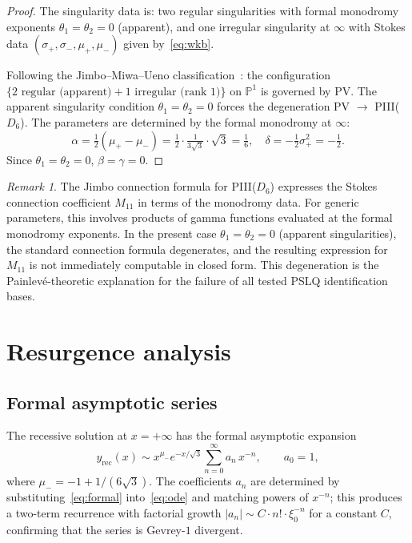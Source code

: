 \documentclass[11pt,a4paper]{article}
\theoremstyle{definition}
\theoremstyle{remark}
\newtheorem{remark}[theorem]{Remark}
\begin{document}
\begin{proof}
The singularity data is: two regular
singularities with formal monodromy
exponents $\theta_1 = \theta_2 = 0$
(apparent), and one irregular singularity
at $\infty$ with Stokes data
$(\sigma_+, \sigma_-, \mu_+, \mu_-)$
given by~\eqref{eq:wkb}.

Following the Jimbo--Miwa--Ueno
classification~\cite{jimbo1981}:
the configuration
$\{2 \text{ regular (apparent)} +
1 \text{ irregular (rank 1)}\}$ on
$\mathbb{P}^1$ is governed by PV.
The apparent singularity condition
$\theta_1 = \theta_2 = 0$ forces the
degeneration PV $\to$ PIII($D_6$).
The parameters are determined by the
formal monodromy at $\infty$:
\[
  \alpha = \tfrac{1}{2}(\mu_+ - \mu_-)
  = \tfrac{1}{2} \cdot \tfrac{1}{3\sqrt{3}}
  \cdot \sqrt{3}
  = \tfrac{1}{6},
  \quad \delta = -\tfrac{1}{2}\sigma_+^2
  = -\tfrac{1}{2}.
\]
Since $\theta_1 = \theta_2 = 0$,
$\beta = \gamma = 0$.
\end{proof}

\begin{remark}
The Jimbo connection formula for PIII($D_6$)
expresses the Stokes connection coefficient
$M_{11}$ in terms of the monodromy data.
For generic parameters, this involves
products of gamma functions evaluated at
the formal monodromy exponents. In the
present case $\theta_1 = \theta_2 = 0$
(apparent singularities), the standard
connection formula degenerates, and the
resulting expression for $M_{11}$ is not
immediately computable in closed form.
This degeneration is the Painlev\'e-theoretic
explanation for the failure of all tested
PSLQ identification bases.
\end{remark}


\section{Resurgence analysis}
\label{sec:resurgence}

\subsection{Formal asymptotic series}

The recessive solution at $x=+\infty$ has the
formal asymptotic expansion
\begin{equation}\label{eq:formal}
  y_{\mathrm{rec}}(x) \sim
  x^{\mu_-} e^{-x/\sqrt{3}}
  \sum_{n=0}^{\infty} a_n\,x^{-n},
  \qquad a_0 = 1,
\end{equation}
where $\mu_- = -1 + 1/(6\sqrt{3})$.
The coefficients $a_n$ are determined by
substituting~\eqref{eq:formal}
into~\eqref{eq:ode} and matching powers of
$x^{-n}$; this produces a two-term recurrence
with factorial growth $|a_n| \sim C \cdot n!
\cdot \xi_0^{-n}$ for a constant $C$,
confirming that the series is Gevrey-$1$
divergent.
\end{document}
